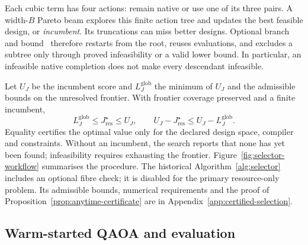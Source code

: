 \documentclass[a4paper,onecolumn,11pt,unpublished]{quantumarticle}
\theoremstyle{remark}
\begin{document}
Each cubic term has four actions: remain native or use one of its three
pairs. A width-$B$ Pareto beam explores this finite action tree and updates
the best feasible design, or \emph{incumbent}. Its truncations can miss better
designs. Optional branch and bound~\cite{LandDoig1960,LawlerWood1966}
therefore restarts from the root, reuses
evaluations, and excludes a subtree only through proved infeasibility or a
valid lower bound. In particular, an infeasible native completion does not
make every descendant infeasible.

Let $U_J$ be the incumbent score and $L_J^{\mathrm{glob}}$ the minimum of
$U_J$ and the admissible bounds on the unresolved frontier. With frontier
coverage preserved and a finite incumbent,
\begin{equation}
L_J^{\mathrm{glob}}\leq J_{\mathrm{res}}^\star\leq U_J,
\qquad U_J-J_{\mathrm{res}}^\star\leq U_J-L_J^{\mathrm{glob}}.
\label{eq:anytime-certificate}
\end{equation}
Equality certifies the optimal value only for the declared design space,
compiler and constraints. Without an incumbent, the search reports that
none has yet been found; infeasibility requires exhausting the frontier.
Figure~\ref{fig:selector-workflow} summarises the procedure.
The historical Algorithm~\ref{alg:selector} includes an optional fibre check;
it is disabled for the primary resource-only problem. Its admissible bounds, numerical requirements and
the proof of Proposition~\ref{prop:anytime-certificate} are in
Appendix~\ref{app:certified-selection}.

\subsection{Warm-started QAOA and evaluation}
\label{sec:warm-start}
\label{sec:warm-start-state}
\label{sec:ws-qaoa}
\label{sec:cost-consistency}
\end{document}
